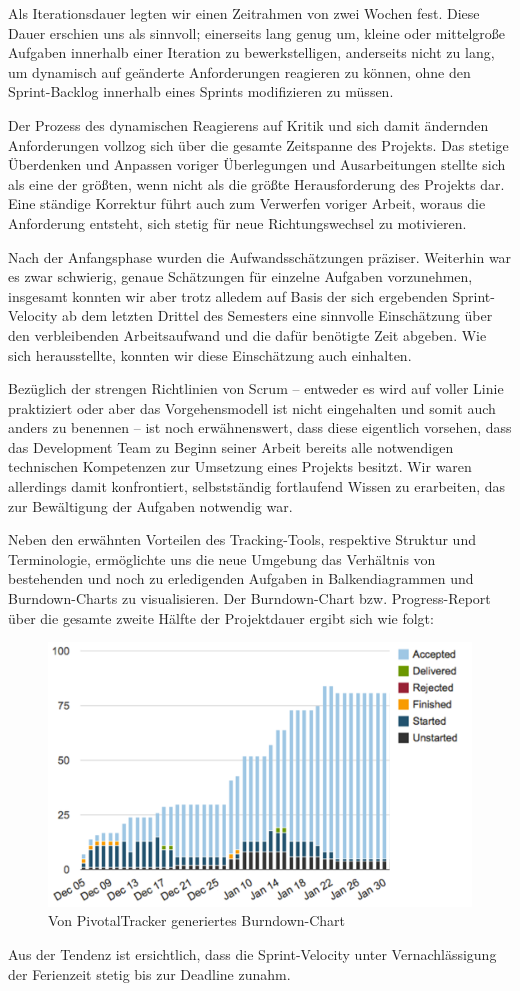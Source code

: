 	Als Iterationsdauer legten wir einen Zeitrahmen von zwei Wochen fest. Diese Dauer erschien uns als sinnvoll; einerseits lang genug um, kleine oder mittelgroße Aufgaben innerhalb einer Iteration zu bewerkstelligen, anderseits nicht zu lang, um dynamisch auf geänderte Anforderungen reagieren zu können, ohne den Sprint-Backlog innerhalb eines Sprints modifizieren zu müssen. 
	
	Der Prozess des dynamischen Reagierens auf Kritik und sich damit ändernden Anforderungen vollzog sich über die gesamte Zeitspanne des Projekts. Das stetige Überdenken und Anpassen voriger Überlegungen und Ausarbeitungen stellte sich als eine der größten, wenn nicht als die größte Herausforderung des Projekts dar. Eine ständige Korrektur führt auch zum Verwerfen voriger Arbeit, woraus die Anforderung entsteht, sich stetig für neue Richtungswechsel zu motivieren.  

	Nach der Anfangsphase wurden die Aufwandsschätzungen präziser. Weiterhin war es zwar schwierig, genaue Schätzungen für einzelne Aufgaben vorzunehmen, insgesamt konnten wir aber trotz alledem auf Basis der sich ergebenden Sprint-Velocity ab dem letzten Drittel des Semesters eine sinnvolle Einschätzung über den verbleibenden Arbeitsaufwand und die dafür benötigte Zeit abgeben. Wie sich herausstellte, konnten wir diese Einschätzung auch einhalten. 

	Bezüglich der strengen Richtlinien von Scrum – entweder es wird auf voller Linie praktiziert oder aber das Vorgehensmodell ist nicht eingehalten und somit auch anders zu benennen – ist noch erwähnenswert, dass diese eigentlich vorsehen, dass das Development Team zu Beginn seiner Arbeit bereits alle notwendigen technischen Kompetenzen zur Umsetzung eines Projekts besitzt. Wir waren allerdings damit konfrontiert, selbstständig fortlaufend Wissen zu erarbeiten, das zur Bewältigung der Aufgaben notwendig war.

	 Neben den erwähnten Vorteilen des Tracking-Tools, respektive Struktur und Terminologie, ermöglichte uns die neue Umgebung das Verhältnis von bestehenden und noch zu erledigenden Aufgaben in Balkendiagrammen und Burndown-Charts zu visualisieren. Der Burndown-Chart bzw. Progress-Report über die gesamte zweite Hälfte der Projektdauer ergibt sich wie folgt:
	 
\begin{figure}[h]
	\centering
	\hspace{1.6cm}\includegraphics[width=.6\textwidth]{Pictures/burndown-compiled}
	\caption{Von PivotalTracker generiertes Burndown-Chart \label{fig:BurndownCompiled}}
\end{figure}

	Aus der Tendenz ist ersichtlich, dass die Sprint-Velocity unter Vernachlässigung der Ferienzeit stetig  bis zur Deadline zunahm.